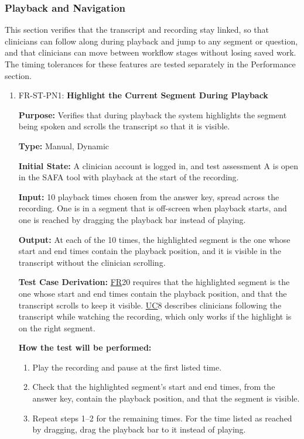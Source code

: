 \documentclass[12pt, titlepage]{article}
\newcommand{\srsfr}[1]{\href{https://github.com/Nour-Fawaz/MacaBoca/blob/main/pdfs/SRS/SRS.pdf}{FR}}
\newcommand{\srsuc}[1]{\href{https://github.com/Nour-Fawaz/MacaBoca/blob/main/pdfs/SRS/SRS.pdf}{UC}}
\renewcommand{\_}{\oldunderscore\allowbreak}
\begin{document}
\subsubsection{Playback and Navigation}
This section verifies that the transcript and recording stay linked, so that clinicians can follow along during playback and jump to any segment or question, and that clinicians can move between workflow stages without losing saved work.
The timing tolerances for these features are tested separately in the Performance section.
\begin{enumerate}
  \item FR-ST-PN1: \textbf{Highlight the Current Segment During Playback\\}
  \begin{mdframed}[linewidth=0.5mm]
      \textbf{Purpose:} Verifies that during playback the system highlights the segment being spoken and scrolls the transcript so that it is visible. \par
      \textbf{Type:} Manual, Dynamic \par
      \textbf{Initial State:} A clinician account is logged in, and test assessment A is open in the SAFA tool with playback at the start of the recording. \par
      \textbf{Input:} 10 playback times chosen from the answer key, spread across the recording. One is in a segment that is off-screen when playback starts, and one is reached by dragging the playback bar instead of playing. \par
      \textbf{Output:} At each of the 10 times, the highlighted segment is the one whose start and end times contain the playback position, and it is visible in the transcript without the clinician scrolling. \par
      \textbf{Test Case Derivation:} \srsfr*{20} requires that the highlighted segment is the one whose start and end times contain the playback position, and that the transcript scrolls to keep it visible. \srsuc*{8} describes clinicians following the transcript while watching the recording, which only works if the highlight is on the right segment. \par
      \textbf{How the test will be performed:}
      \begin{enumerate}
        \item[1.] Play the recording and pause at the first listed time.
        \item[2.] Check that the highlighted segment's start and end times, from the answer key, contain the playback position, and that the segment is visible.
        \item[3.] Repeat steps 1--2 for the remaining times. For the time listed as reached by dragging, drag the playback bar to it instead of playing.
      \end{enumerate}
  \end{mdframed}


\end{enumerate}
\end{document}
